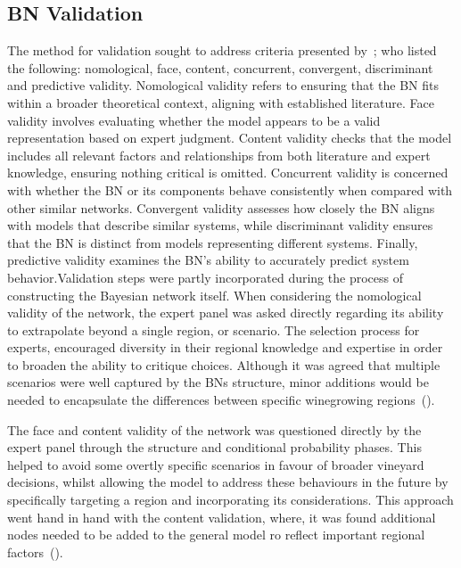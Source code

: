 \documentclass[fleqn,10pt]{wlscirep}
\begin{document}
\subsection*{BN Validation}

The method for validation sought to address criteria presented by~\cite{pitchforthProposedValidationFramework2013}; who listed the following:  nomological, face, content, concurrent, convergent, discriminant and predictive validity. Nomological validity refers to ensuring that the BN fits within a broader theoretical context, aligning with established literature. Face validity involves evaluating whether the model appears to be a valid representation based on expert judgment. Content validity checks that the model includes all relevant factors and relationships from both literature and expert knowledge, ensuring nothing critical is omitted. Concurrent validity is concerned with whether the BN or its components behave consistently when compared with other similar networks. Convergent validity assesses how closely the BN aligns with models that describe similar systems, while discriminant validity ensures that the BN is distinct from models representing different systems. Finally, predictive validity examines the BN's ability to accurately predict system behavior.Validation steps were partly incorporated during the process of constructing the Bayesian network itself. When considering the nomological validity of the network, the expert panel was asked directly regarding its ability to extrapolate beyond a single region, or scenario. The selection process for experts, encouraged diversity in their regional knowledge and expertise in order to broaden the ability to critique choices. Although it was agreed that multiple scenarios were well captured by the BNs structure, minor additions would be needed to encapsulate the differences between specific winegrowing regions~(\cite{abbalDecisionSupportSystem2016,agostaRegionalClimateVariability2012,soarClimateDriversRed2008}).

The face and content validity of the network was questioned directly by the expert panel through the structure and conditional probability phases. This helped to avoid some overtly specific scenarios in favour of broader vineyard decisions, whilst allowing the model to address these behaviours in the future by specifically targeting a region and incorporating its considerations. This approach went hand in hand with the content validation, where, it was found additional nodes needed to be added to the general model ro reflect important regional factors~(\cite{abbalDecisionSupportSystem2016,ellisUsingBayesianGrowth2020,agostaRegionalClimateVariability2012,barriguinhaVineyardYieldEstimation2021,brockRelationSoilOrganic2011}).
\end{document}
